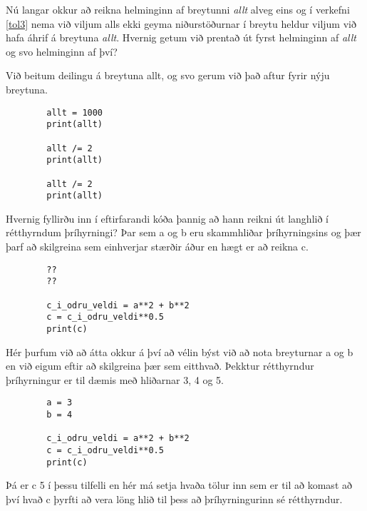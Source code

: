 \begin{exercise}\label{tol4}
	Nú langar okkur að reikna helminginn af breytunni \textit{allt} alveg eins og í verkefni \ref{tol3} nema við viljum alls ekki geyma niðurstöðurnar í breytu heldur viljum við hafa áhrif á breytuna \textit{allt}.
	Hvernig getum við prentað út fyrst helminginn af \textit{allt} og svo helminginn af því?
\end{exercise}
\begin{Answer}[ref={tol4}]
	Við beitum deilingu á breytuna allt, og svo gerum við það aftur fyrir nýju breytuna.
	\begin{lstlisting}
		allt = 1000
		print(allt)
		
		allt /= 2
		print(allt)
		
		allt /= 2
		print(allt)
	\end{lstlisting}
\end{Answer}

\begin{exercise}\label{tol5}
	Hvernig fyllirðu inn í eftirfarandi kóða þannig að hann reikni út langhlið í rétthyrndum þríhyrningi?
	Þar sem a og b eru skammhliðar þríhyrningsins og þær þarf að skilgreina sem einhverjar stærðir áður en hægt er að reikna c.
	\begin{lstlisting}
		??
		??
	
		c_i_odru_veldi = a**2 + b**2
		c = c_i_odru_veldi**0.5
		print(c)\end{lstlisting}
\end{exercise}
\begin{Answer}[ref={tol5}]
	Hér þurfum við að átta okkur á því að vélin býst við að nota breyturnar a og b en við eigum eftir að skilgreina þær sem eitthvað.
	Þekktur rétthyrndur þríhyrningur er til dæmis með hliðarnar 3, 4 og 5.
	\begin{lstlisting}
		a = 3
		b = 4
		
		c_i_odru_veldi = a**2 + b**2
		c = c_i_odru_veldi**0.5
		print(c)
	\end{lstlisting}
	Þá er c 5 í þessu tilfelli en hér má setja hvaða tölur inn sem er til að komast að því hvað c þyrfti að vera löng hlið til þess að þríhyrningurinn sé rétthyrndur.
\end{Answer}